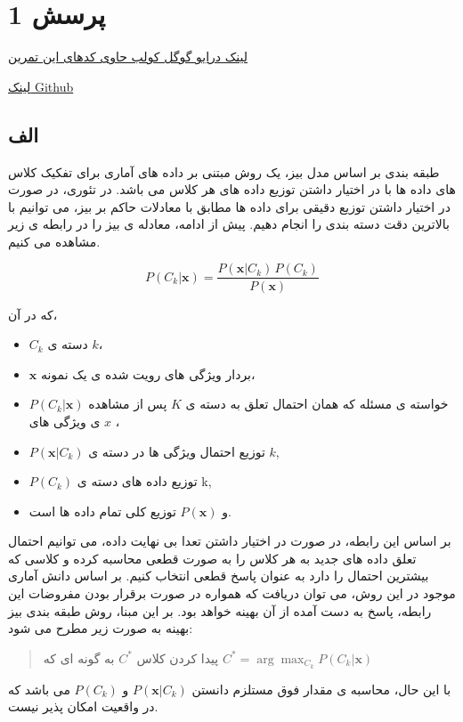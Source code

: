 \documentclass{article}
\begin{document}



\tableofcontents
\newpage


\section{پرسش 1}
\href{https://drive.google.com/drive/folders/1S5vMJYXH87PQ1vcxzW19rEgpDQKK5_Ni?usp=sharing}{لینک درایو گوگل کولب حاوی کدهای این تمرین}

\href{https://github.com/Alireza2001Amiri/KNTU-ML}{لینک Github}

\subsection{الف}
طبقه بندی بر اساس مدل بیز، یک روش مبتنی بر داده های آماری برای تفکیک کلاس های داده ها با در اختیار داشتن توزیع داده های هر کلاس می باشد. در تئوری، در صورت در اختیار داشتن توزیع دقیقی برای داده ها مطابق با معادلات حاکم بر بیز، می توانیم با بالاترین دقت دسته بندی را انجام دهیم. پیش از ادامه، معادله ی بیز را در رابطه ی زیر مشاهده می کنیم.

\begin{equation}
P(C_k | \mathbf{x}) = \frac{P(\mathbf{x} | C_k) \, P(C_k)}{P(\mathbf{x})}
\end{equation}

که در آن، 
\begin{itemize}
\item 
$C_k$ دسته ی $k$،
\item
$\mathbf{x}$ بردار ویژگی های رویت شده ی یک نمونه، 
\item
$P(C_k|\mathbf{x})$ خواسته ی مسئله که همان احتمال تعلق به دسته ی $K$ پس از مشاهده ی ویژگی های $x$ ،
\item
$P(\mathbf{x}|C_k)$ توزیع احتمال ویژگی ها در دسته ی $k$,
\item
$P(C_k)$ توزیع داده های دسته ی k,
\item
و $P(\mathbf{x})$ توزیع کلی تمام داده ها است.
\end{itemize}

بر اساس این رابطه، در صورت در اختیار داشتن تعدا بی نهایت داده، می توانیم احتمال تعلق داده های جدید به هر کلاس را به صورت قطعی محاسبه کرده و کلاسی که بیشترین احتمال را دارد به عنوان پاسخ قطعی انتخاب کنیم. بر اساس دانش آماری موجود در این روش، می توان دریافت که همواره در صورت برقرار بودن مفروضات این رابطه، پاسخ به دست آمده از آن بهینه خواهد بود. بر این مبنا، روش طبقه بندی بیز بهینه به صورت زیر مطرح می شود:
\begin{quote}
        پیدا کردن کلاس $C^*$ به گونه ای که $C^* = \arg\max_{C_k} P(C_k | \mathbf{x})$
\end{quote}
با این حال، محاسبه ی مقدار فوق مستلزم دانستن $P(\mathbf{x}|C_k)$ و $P(C_k)$ می باشد که در واقعیت امکان پذیر نیست.
\end{document}
